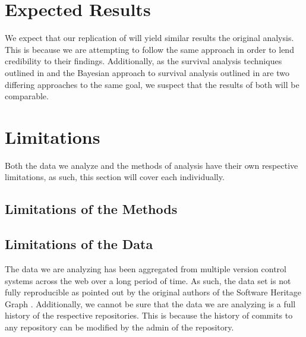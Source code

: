 \documentclass[conference]{IEEEtran}
\begin{document}
\section{Expected Results}

We expect that our replication of \cite{ali2020cheating} will yield similar results the original analysis. This is because we are attempting to follow the same approach in order to lend credibility to their findings. Additionally, as the survival analysis techniques outlined in \cite{ali2020cheating} and the Bayesian approach to survival analysis outlined in \cite{kelter2020bayesian} are two differing approaches to the same goal, we suspect that the results of both will be comparable.

\section{Limitations}

Both the data we analyze and the methods of analysis have their own respective limitations, as such, this section will cover each individually.

\subsection{Limitations of the Methods}



\subsection{Limitations of the Data}

The data we are analyzing has been aggregated from multiple version control systems across the web over a long period of time. As such, the data set is not fully reproducible as pointed out by the original authors of the Software Heritage Graph \cite{pietri2019software}. Additionally, we cannot be sure that the data we are analyzing is a full history of the respective repositories. This is because the history of commits to any repository can be modified by the admin of the repository.



\end{document}
